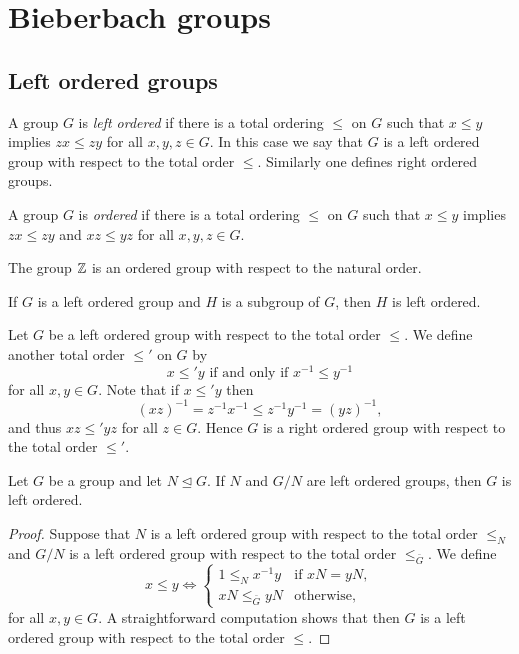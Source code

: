 \chapter{Bieberbach groups}
\label{Bieberbach}

\section{Left ordered groups}


A group $G$ is {\em left ordered} if there is a total ordering $\leq$ on $G$ 
such that $x\leq y$ implies $zx\leq zy$ for all $x,y,z\in G$. In this case we say that $G$ is a left ordered group with respect to the total order $\leq$. Similarly one
defines right ordered groups. 

A group $G$ is {\em ordered} if there is a total ordering $\leq$ on $G$ 
such that $x\leq y$ implies $zx\leq zy$ and $xz\leq yz$ for all $x,y,z\in G$.

\begin{example}
The group $\mathbb{Z}$ is an ordered group with respect to the natural order. 
\end{example}

\begin{example}
	If $G$ is a left ordered group and $H$ is a subgroup of $G$, then $H$ is left ordered.
\end{example}

\begin{remark}
Let $G$ be a left ordered group with respect to the total order $\leq$. We define another total order $\leq'$ on $G$ by
\[ x\leq' y\text{ if and only if }x^{-1}\leq y^{-1}\]
for all $x,y\in G$. Note that if $x\leq' y$ then
\[ (xz)^{-1}=z^{-1}x^{-1}\leq z^{-1}y^{-1}=(yz)^{-1},\]
and thus $xz\leq' yz$ for all $z\in G$. Hence $G$ is a right ordered group with respect to the total order $\leq'$.
\end{remark}

\begin{proposition}\label{prop:LOgroup1}
Let $G$ be a group and let $N\unlhd G$. If $N$ and $G/N$ are left ordered groups, then $G$ is left ordered. 
\end{proposition}

\begin{proof}
Suppose that $N$ is a left ordered group with respect to the total order $\leq_N$ and $G/N$ is a left ordered group with respect to the total order $\leq_{\bar G}$.	We define 
	\[
	x\leq y\Longleftrightarrow
	\begin{cases}
		1\leq_N x^{-1}y & \text{if $xN=yN$},\\
		xN\leq_{\bar G}yN & \text{otherwise},		
	\end{cases}
	\]
for all $x,y\in G$.	A straightforward computation shows that then $G$ is a left ordered group with respect to the total order $\leq$. 
\end{proof}

